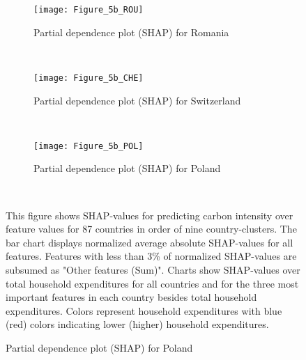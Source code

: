 \begin{figure}[ht!]\ContinuedFloat
    \centering
   \begin{subfigure}[b]{\textwidth}
         \centering
         \caption{Partial dependence plot (SHAP) for Romania}
         \label{fig:5b_ROU}
         \texttt{[image: Figure\_5b\_ROU]}         
     \end{subfigure}
    \\
    \vspace{0.5cm}
   \begin{subfigure}[b]{\textwidth}
         \centering
         \caption{Partial dependence plot (SHAP) for Switzerland}
         \label{fig:5b_CHE}
         \texttt{[image: Figure\_5b\_CHE]}         
     \end{subfigure}
    \\
    \vspace{0.5cm}
   \begin{subfigure}[b]{\textwidth}
         \centering
         \caption{Partial dependence plot (SHAP) for Poland}
         \label{fig:5b_POL}
         \texttt{[image: Figure\_5b\_POL]}
    \end{subfigure}
    \\
    \vspace{0.5cm}
    \begin{subcaption2}
     This figure shows SHAP-values for predicting carbon intensity over feature values for 87 countries in order of nine country-clusters. The bar chart displays normalized average absolute SHAP-values for all features. Features with less than 3\% of normalized SHAP-values are subsumed as "Other features (Sum)". Charts show SHAP-values over total household expenditures for all countries and for the three most important features in each country besides total household expenditures. Colors represent household expenditures with blue (red) colors indicating lower (higher) household expenditures.
     \end{subcaption2}
\end{figure}

